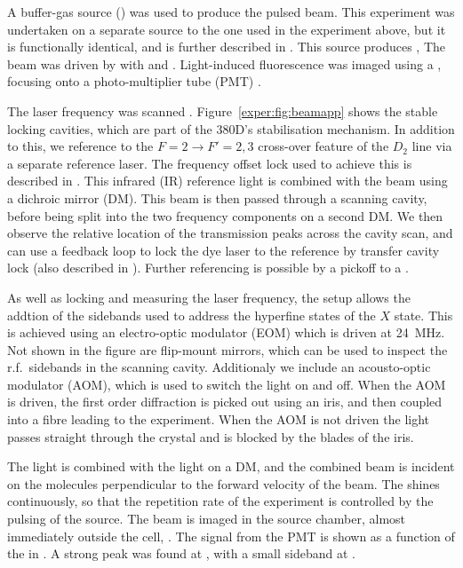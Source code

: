 A buffer-gas source () was used to produce the pulsed \CaF{}
beam.  This experiment was undertaken on a separate \CaF{} source to the one
used in the experiment above, but it is functionally identical, and is further
described in . This source produces ,  The beam was driven by  with  and
. Light-induced fluorescence was imaged using a , focusing onto a photo-multiplier tube (PMT) .

The laser frequency was scanned . Figure~\ref{exper:fig:beamapp} shows the stable locking cavities,
which are part of the 380D's stabilisation mechanism. In addition to this, we
reference  to the $F=2 \rightarrow F'=2, 3$ cross-over feature of
the \esRb{} $D_2$ line via a separate reference laser. The frequency offset
lock used to achieve this is described in . This
infrared (IR) reference light is combined with the  beam using  a
dichroic mirror (DM). This beam is then passed through a scanning cavity,
before being split into the two frequency components on a second DM. We then
observe the relative location of the transmission peaks across the cavity scan,
and can use a feedback loop to lock the dye laser to the reference by transfer
cavity lock (also described in ). Further referencing
is possible by a pickoff to a .

As well as locking and measuring the laser frequency, the setup allows the
addtion of the sidebands used to address the hyperfine states of the $X$ state.
This is achieved using an electro-optic modulator (EOM) which is driven at
\SI{24}{\mega\hertz}.
%
Not shown in the figure are flip-mount mirrors, which can be used to inspect
the r.f.\ sidebands in the scanning cavity.
%
Additionaly we include an acousto-optic modulator (AOM),
which is used to switch the light on and off. When the AOM is driven, the first
order diffraction is picked out using an iris, and then coupled into a fibre
leading to the experiment. When the AOM is not driven the light passes straight
through the crystal and is blocked by the blades of the iris.

The  light is combined with the  light on a DM, and
the combined beam is incident on the \CaF{} molecules perpendicular to
the forward velocity of the beam. The shines continuously, so that the
repetition rate of the experiment is controlled by the pulsing of the \CaF{}
source. The beam is imaged in the source chamber, almost immediately outside
the cell, .
%
The signal from the PMT is shown as a function of the  in . A strong peak was found at
, with a small sideband at  . 

